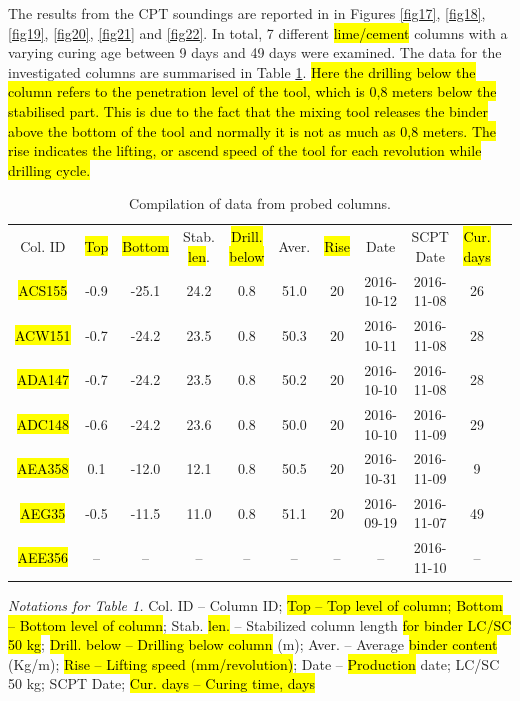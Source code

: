 \documentclass[final,3p,times,onecolumn,authoryear]{elsarticle}
\begin{document}
The results from the CPT soundings are reported in in Figures \ref{fig17}, \ref{fig18}, \ref{fig19}, \ref{fig20}, \ref{fig21} and \ref{fig22}. In total, 7 different \hl{lime/cement} columns with a varying curing age between 9 days and 49 days were examined. The data for the investigated columns are summarised in Table \ref{tab:1}. \hl{Here the drilling below the column refers to the penetration level of the tool, which is 0,8 meters below the stabilised part. This is due to the fact that the mixing tool releases the binder above the bottom of the tool and normally it is not as much as 0,8 meters. The rise indicates the lifting, or ascend speed of the tool for each revolution while drilling cycle. }

\begin{table}[t]
\begin{threeparttable}
   \caption{Compilation of data from probed columns.}
  \centering
  \begin{tabular}{| c c c c c c c c c c c |}
    Col. ID & \hl{Top} & \hl{Bottom} & Stab. \hl{len}. & \hl{Drill. below} & Aver. & \hl{Rise} & Date & SCPT Date & \hl{Cur. days} \\
    \hl{ACS155} & -0.9 & -25.1 & 24.2 & 0.8 & 51.0 & 20 & 2016-10-12 & 2016-11-08 & 26 \\
    \hl{ACW151} & -0.7 & -24.2 & 23.5 & 0.8 & 50.3 & 20 & 2016-10-11 & 2016-11-08 & 28 \\
    \hl{ADA147} & -0.7 & -24.2 & 23.5 & 0.8 & 50.2 & 20 & 2016-10-10 & 2016-11-08 & 28 \\
    \hl{ADC148} & -0.6 & -24.2 & 23.6 & 0.8 & 50.0 & 20 & 2016-10-10 & 2016-11-09 & 29 \\
    \hl{AEA358} & 0.1 & -12.0 & 12.1 & 0.8 & 50.5 & 20 & 2016-10-31 & 2016-11-09 & 9 \\
    \hl{AEG35} & -0.5 & -11.5 & 11.0 & 0.8 & 51.1 & 20 & 2016-09-19 & 2016-11-07 & 49 \\
    \hl{AEE356} & -- & -- & -- & -- & -- & -- & -- & 2016-11-10 & --
  \end{tabular}
  \label{tab:1}
   \begin{tablenotes}
      \footnotesize
      	\item \emph{Notations for Table 1.} Col. ID -- Column ID; \hl{Top -- Top level of column; Bottom -- Bottom level of column}; Stab. \hl{len.} -- Stabilized column length \hl{for binder LC/SC 50 kg}; \hl{Drill. below -- Drilling below column} (m); Aver. -- Average \hl{binder content }(Kg/m); \hl{Rise -- Lifting speed (mm/revolution)}; Date -- \hl{Production }date; LC/SC 50 kg; SCPT Date; \hl{Cur. days -- Curing time, days}
    \end{tablenotes}
  \end{threeparttable}
\end{table}
\end{document}
